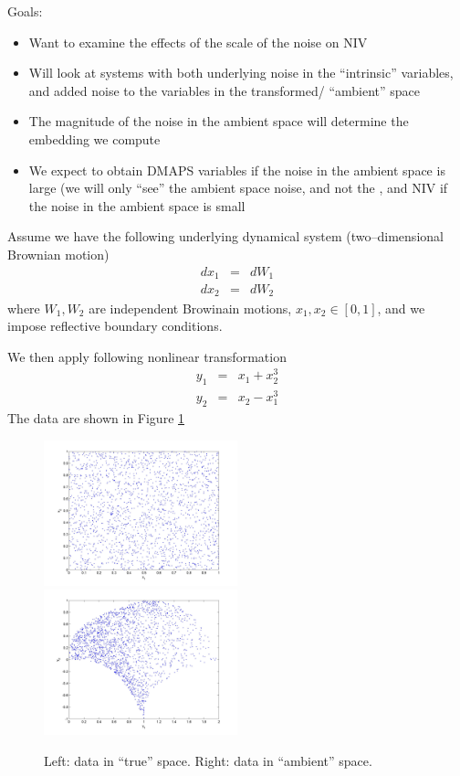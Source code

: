\documentclass[12pt]{article}
\begin{document}
Goals: 
\begin{itemize}
\item Want to examine the effects of the scale of the noise on NIV
\item Will look at systems with both underlying noise in the ``intrinsic'' variables, and added noise to the variables in the transformed/ ``ambient'' space
\item The magnitude of the noise in the ambient space will determine the embedding we compute
\item We expect to obtain DMAPS variables if the noise in the ambient space is large (we will only ``see'' the ambient space noise, and not the , and NIV if the noise in the ambient space is small
\end{itemize}


Assume we have the following underlying dynamical system (two--dimensional Brownian motion)
\begin{eqnarray}
	dx_1 & = & dW_1 \\
	dx_2 & = & dW_2
\end{eqnarray}
where $W_1, W_2$ are independent Browinain motions, $x_1, x_2 \in [0, 1]$, and we impose reflective boundary conditions.

We then apply following nonlinear transformation
%
\begin{eqnarray}
y_1 & = & x_1 + x_2^3 \\
y_2 & = & x_2 - x_1^3
\end{eqnarray}
%
The data are shown in Figure \ref{fig:data}

\begin{figure}[htb]
\includegraphics[width=0.5\textwidth]{xdata}
\includegraphics[width=0.5\textwidth]{ydata}
\caption{Left: data in ``true'' space. Right: data in ``ambient'' space.}
\label{fig:data}
\end{figure}
\end{document}

